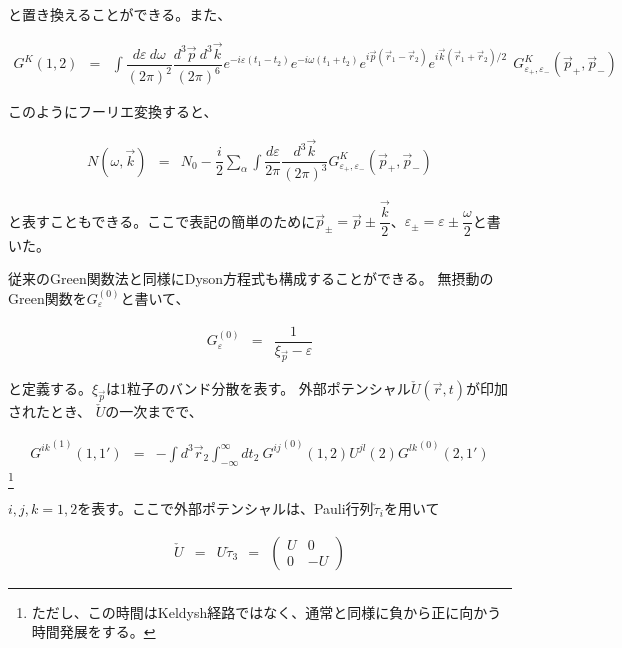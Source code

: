 \documentclass[uplatex,a4j,12pt,dvipdfmx]{jsarticle}
\begin{document}
と置き換えることができる。また、

\begin{eqnarray}
	G^{K} (1,2)
	&=&
	\int \!\! \dfrac{d \varepsilon \ d \omega}{(2 \pi)^{2}} \dfrac{d^{3} \vec{p} \ d^{3} \vec{k}}{(2 \pi)^{6}}
	e^{- i \varepsilon (t_{1} - t_{2})}
	e^{- i \omega (t_{1} + t_{2})}
	e^{i \vec{p} (\vec{r}_{1} - \vec{r}_{2})}
	e^{i \vec{k} (\vec{r}_{1} + \vec{r}_{2})/2}
	\ \
	G^{K}_{\varepsilon_{+},\varepsilon_{-}} (\vec{p}_{+},\vec{p}_{-})
\end{eqnarray}

このようにフーリエ変換すると、

\begin{eqnarray}
	N(\omega,\vec{k})
	&=&
	N_{0} -
	\dfrac{i}{2}
	\sum_{\alpha}
	\int \!\! \dfrac{d \varepsilon}{2 \pi} \dfrac{d^{3} \vec{k}}{(2 \pi)^{3}}
	G^{K}_{\varepsilon_{+},\varepsilon_{-}} (\vec{p}_{+},\vec{p}_{-})
\end{eqnarray}

と表すこともできる。ここで表記の簡単のために$\vec{p}_{\pm}=\vec{p} \pm \dfrac{\vec{k}}{2}$、$\varepsilon_{\pm}=\varepsilon \pm \dfrac{\omega}{2}$と書いた。



従来のGreen関数法と同様にDyson方程式も構成することができる。
無摂動のGreen関数を$G^{(0)}_{\varepsilon}$と書いて、

\begin{eqnarray}
	G^{(0)}_{\varepsilon}
	&=&
	\dfrac{1}{\xi_{\vec{p}} - \varepsilon}
\end{eqnarray}

と定義する。$\xi_{\vec{p}}$は1粒子のバンド分散を表す。
外部ポテンシャル$\check{U}(\vec{r},t)$が印加されたとき、
$\check{U}$の一次までで、

\begin{eqnarray}
	{{G^{ik}}^{(1)}}(1,1')
	&=&
	- \int \!\! d^{3} \vec{r}_{2} \int^{\infty}_{-\infty} \!\!\! dt_{2} \
	{{G^{ij}}^{(0)}} (1,2) U^{jl}(2) {G^{lk}}^{(0)}(2,1')
\end{eqnarray}
\footnote{ただし、この時間はKeldysh経路ではなく、通常と同様に負から正に向かう時間発展をする。}

$i,j,k=1,2$を表す。ここで外部ポテンシャルは、Pauli行列$\check{\tau}_{i}$を用いて


\begin{eqnarray}
	\check{U}
	&=&
	U \check{\tau}_{3}
	\ \ = \ \
	\left(
	\begin{array}{ll}
			U & 0
			\\
			0 & -U
		\end{array}
	\right)
\end{eqnarray}
\end{document}
